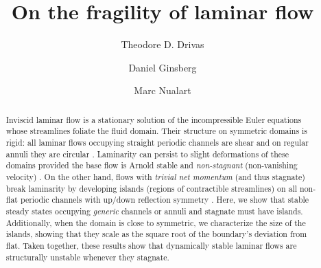 \documentclass[11pt,reqno]{amsproc}
\title{\vspace*{-25mm} On the fragility of laminar flow}
\author{Theodore D. Drivas}
\author{Daniel Ginsberg}
\author{Marc Nualart}
\numberwithin{equation}{section}
\numberwithin{theorem}{section}
\numberwithin{prop}{section}
\numberwithin{cor}{section}
\numberwithin{lemma}{section}
\theoremstyle{remark}
\theoremstyle{definition}
\begin{document}
\maketitle
\vspace{-5mm}
\begin{abstract}
Inviscid laminar flow is a stationary solution of the incompressible Euler equations whose streamlines foliate the fluid domain.  Their structure on symmetric domains is rigid:
all laminar flows occupying straight periodic channels are shear and on regular annuli they are circular \cite{drivas2024geometric}.  Laminarity can persist to slight deformations of these domains provided the base flow is Arnold stable and \textit{non-stagnant} (non-vanishing velocity) \cite{CDG21}. On the other hand, flows with \textit{trivial net momentum} (and thus stagnate) break laminarity by developing islands (regions of contractible streamlines) on all non-flat periodic channels with up/down reflection symmetry \cite{drivas2024islands}.
Here, we show that stable steady states occupying \textit{generic} channels or annuli and stagnate must have islands. Additionally, when the domain is close to symmetric, we characterize the size of the islands, showing that they scale as the square root of the boundary's deviation from flat.  Taken together, these results show that dynamically stable laminar flows are structurally unstable whenever they stagnate.
\end{abstract}
\end{document}
